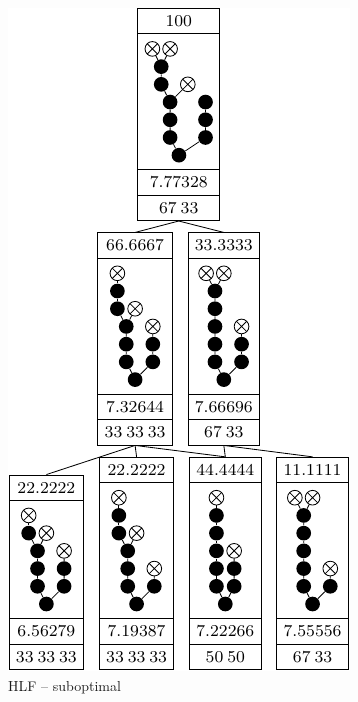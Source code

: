 \begin{figure}[ht]
  \centering
  \begin{subfigure}{.45\linewidth}
    \centering
    \includegraphics{p3/hlf_not_optimal/00123455799_subopt.pdf}
    \caption{HLF -- suboptimal}
  \end{subfigure}
  \begin{subfigure}{.45\linewidth}
    \centering

\end{subfigure}
\end{figure}
